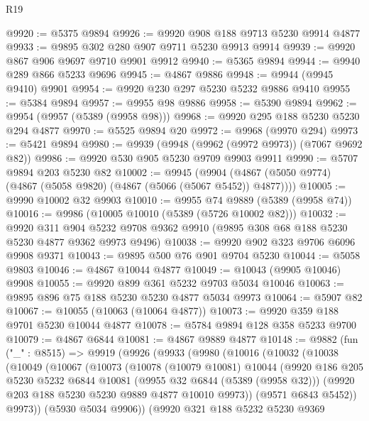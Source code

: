 \begin{lexlean}{R19}
\begin{coremodule}
@9920 := @5375 @9894
@9926 := @9920 @908 @188 @9713 @5230 @9914 @4877
@9933 := @9895 @302 @280 @907 @9711 @5230 @9913 @9914
@9939 := @9920 @867 @906 @9697 @9710 @9901 @9912
@9940 := @5365 @9894
@9944 := @9940 @289 @866 @5233 @9696
@9945 := @4867 @9886
@9948 := @9944 (@9945 @9410) @9901
@9954 := @9920 @230 @297 @5230 @5232 @9886 @9410
@9955 := @5384 @9894
@9957 := @9955 @98 @9886
@9958 := @5390 @9894
@9962 := @9954 (@9957 (@5389 (@9958 @98)))
@9968 := @9920 @295 @188 @5230 @5230 @294 @4877
@9970 := @5525 @9894 @20
@9972 := @9968 (@9970 @294)
@9973 := @5421 @9894
@9980 := @9939 (@9948 (@9962 (@9972 @9973)) (@7067 @9692 @82))
@9986 := @9920 @530 @905 @5230 @9709 @9903 @9911
@9990 := @5707 @9894 @203 @5230 @82
@10002 := @9945
    (@9904 (@4867 (@5050 @9774) (@4867 (@5058 @9820) (@4867 (@5066 (@5067 @5452)) @4877))))
@10005 := @9990 @10002 @32 @9903
@10010 := @9955 @74 @9889 (@5389 (@9958 @74))
@10016 := @9986 (@10005 @10010 (@5389 (@5726 @10002 @82)))
@10032 := @9920
    @311
    @904
    @5232
    @9708
    @9362
    @9910
    (@9895 @308 @68 @188 @5230 @5230 @4877 @9362 @9973 @9496)
@10038 := @9920 @902 @323 @9706 @6096 @9908 @9371
@10043 := @9895 @500 @76 @901 @9704 @5230
@10044 := @5058 @9803
@10046 := @4867 @10044 @4877
@10049 := @10043 (@9905 @10046) @9908
@10055 := @9920 @899 @361 @5232 @9703 @5034 @10046
@10063 := @9895 @896 @75 @188 @5230 @5230 @4877 @5034 @9973
@10064 := @5907 @82
@10067 := @10055 (@10063 (@10064 @4877))
@10073 := @9920 @359 @188 @9701 @5230 @10044 @4877
@10078 := @5784 @9894 @128 @358 @5233 @9700
@10079 := @4867 @6844
@10081 := @4867 @9889 @4877
@10148 := @9882
    (fun ("_" : @8515) =>
    @9919
      (@9926
        (@9933
          (@9980
            (@10016
              (@10032
                (@10038
                  (@10049
                    (@10067
                      (@10073
                        (@10078
                          (@10079 @10081)
                          @10044
                          (@9920
                            @186
                            @205
                            @5230
                            @5232
                            @6844
                            @10081
                            (@9955 @32 @6844 (@5389 (@9958 @32)))
                            (@9920 @203 @188 @5230 @5230 @9889 @4877 @10010 @9973))
                          (@9571 @6843 @5452))
                        @9973))
                    (@5930 @5034 @9906))
                  (@9920
                    @321
                    @188
                    @5232
                    @5230
                    @9369

\end{coremodule}
\end{lexlean}
